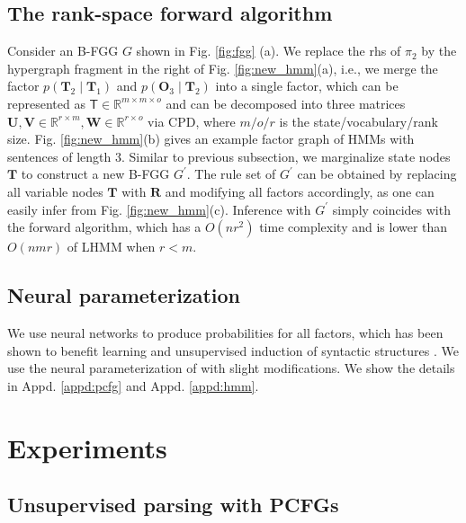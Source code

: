 \documentclass[11pt]{article}
\newcommand{\vect}[1]{\boldsymbol{\mathbf{#1}}}
\newcommand{\rv}[1]{\mathbf{#1}}
\begin{document}
\subsection{The rank-space forward algorithm}
\label{sec:rank-forward}



Consider an B-FGG $G$ shown in Fig. \ref{fig:fgg} (a). We replace the rhs of $\pi_2$ by the hypergraph fragment in the right of Fig. \ref{fig:new_hmm}(a), i.e., we merge the factor $p(\rv{T}_2\mid \rv{T}_1)$ and $p(\rv{O}_3 \mid \rv{T}_2)$ into a single factor, which can be represented as $\mathsf{T}\in \mathbb{R}^{m \times m \times o}$ and can be decomposed into three matrices $\vect{U, V} \in \mathbb{R}^{r \times m}, \vect{W} \in \mathbb{R}^{r \times o}$ via CPD, where $m/o/r$ is the  state/vocabulary/rank size. Fig. \ref{fig:new_hmm}(b) gives an example factor graph of HMMs with sentences of length 3. Similar to previous subsection, we marginalize state nodes $\rv{T}$ to construct a new B-FGG $G^{\prime}$. The rule set of $G^{\prime}$ can be obtained by replacing all variable nodes $\rv{T}$ with $\rv{R}$ and modifying all factors accordingly, as one can 
easily infer from Fig. \ref{fig:new_hmm}(c). Inference with $G^{\prime}$ simply coincides with the forward algorithm, which has a $O(nr^2)$ time complexity and is lower than $O(nmr)$ of LHMM \cite{chiu2021low} when $r < m$.

\subsection{Neural parameterization}
We use neural networks to produce probabilities for all factors, which has been shown to benefit learning and unsupervised induction of syntactic structures \cite{jiang-etal-2016-unsupervised, he-etal-2018-unsupervised, kim-etal-2019-compound, han-etal-2019-enhancing,  jin-etal-2019-unsupervised, zhu-etal-2020-return, yang-etal-2020-second, yang-etal-2021-pcfgs, zhao-titov-2020-visually, zhang-etal-2021-video,  chiu-rush-2020-scaling, chiu2021low, kim2021sequence}.  We use the neural parameterization of \citet{yang-etal-2021-pcfgs} with slight modifications. We show the details in Appd. \ref{appd:pcfg} and Appd. \ref{appd:hmm}. 



\section{Experiments}
\subsection{Unsupervised parsing with PCFGs}
\end{document}
